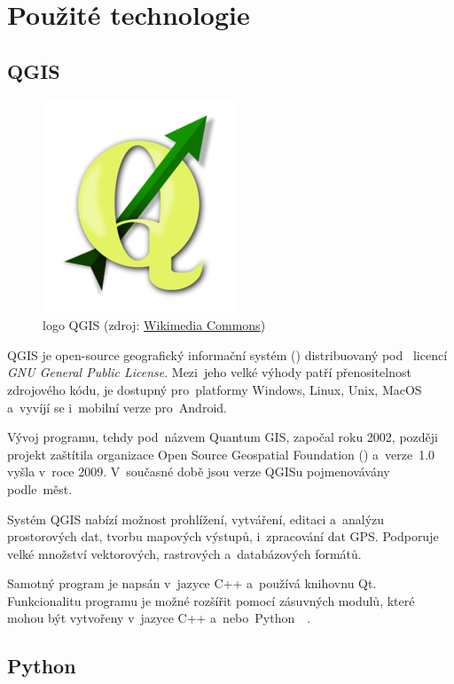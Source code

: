 \chapter{Použité technologie}
\label{3-technologie}

\section{QGIS}
\label{qgis}

	\begin{figure}[H]
		\centering
		\includegraphics[width=.3\textwidth]{./pictures/qgis_logo.png}
      	\caption[logo QGIS]{logo QGIS (zdroj: \href{https://commons.wikimedia.org/wiki/File:QGis_Logo.png}{Wikimedia Commons})}
		\label{fig:qgis_logo}
 	\end{figure}

QGIS je open-source geografický informační systém () distribuovaný pod ~licencí \textit{GNU General Public License}. Mezi~jeho velké výhody patří přenositelnost zdrojového kódu, je dostupný pro~platformy Windows, Linux, Unix, MacOS a~vyvíjí se i~mobilní verze pro~Android.

Vývoj programu, tehdy pod~názvem Quantum GIS, započal roku 2002, později projekt zaštítila organizace Open Source Geospatial Foundation () a~verze~1.0 vyšla v~roce 2009. V~současné době jsou verze QGISu pojmenovávány podle~měst.

Systém QGIS nabízí možnost prohlížení, vytváření, editaci a~analýzu prostorových dat, tvorbu mapových výstupů, i~zpracování dat GPS. Podporuje velké množství vektorových, rastrových a~databázových formátů.

Samotný program je napsán v~jazyce C++ a~používá knihovnu Qt. Funkcionalitu programu je možné rozšířit pomocí zásuvných modulů, které mohou být vytvořeny v~jazyce C++ a~nebo~Python~\citep{qgis}~\citep{wiki_qgis}.

\section{Python}
\label{python}

